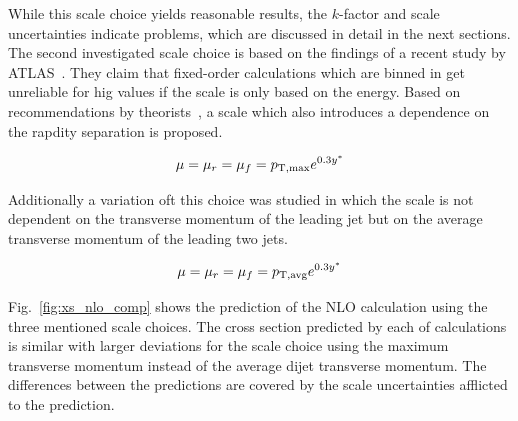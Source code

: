 While this scale choice yields reasonable results, the $k$-factor and scale
uncertainties indicate problems, which are discussed in detail
in the next sections. The second investigated scale choice is based on the
findings of a recent study by ATLAS~\cite{Aad:2011fc}. They claim that
fixed-order calculations which are binned in \ystar get unreliable for hig
\ystar values if the scale is only based on the energy. Based on recommendations
by theorists~\cite{Ellis:1992en}, a scale which also introduces a dependence on
the rapdity separation is proposed.

\begin{equation*}
    \mu = \mu_r = \mu_f = p_{\mathrm{T,max}} e^{0.3 y^*} 
\end{equation*}

Additionally a variation oft this choice was studied in which the scale is not
dependent on the transverse momentum of the leading jet but on the average
transverse momentum of the leading two jets.

\begin{equation*}
    \mu = \mu_r = \mu_f = p_{\mathrm{T,avg}} e^{0.3 y^*} 
\end{equation*}

Fig.~\ref{fig:xs_nlo_comp} shows the prediction of the NLO calculation using
the three mentioned scale choices. The cross section predicted by each of
calculations is similar with larger deviations for the scale choice using the
maximum transverse momentum instead of the average dijet transverse momentum.
The differences between the predictions are covered by the scale uncertainties
afflicted to the prediction.


